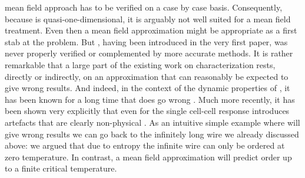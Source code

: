 mean field approach has to be verified on a case by case basis. Consequently,
because  is quasi-one-dimensional, it is arguably not well suited for
a mean field treatment. Even then a mean field approximation might be
appropriate as a first stab at the problem. But , having been
introduced in the very first  paper, was never properly verified or
complemented by more accurate methods. It is rather remarkable that a large
part of the existing work on  characterization rests, directly or
indirectly, on an approximation that can reasonably be expected to give wrong
results. And indeed, in the context of the dynamic properties of , it
has been known for a long time that  does go wrong
\cite{toth2001role}. Much more recently, it has been shown very explicitly that
even for the single cell-cell response  introduces artefacts that are
clearly non-physical \cite{taucer2012consequences}. As an intuitive simple
example where  will give wrong results we can go back to the
infinitely long wire we already discussed above: we argued that due to entropy
the infinite wire can only be ordered at zero temperature. In contrast, a mean
field approximation will predict order up to a finite critical temperature. 

